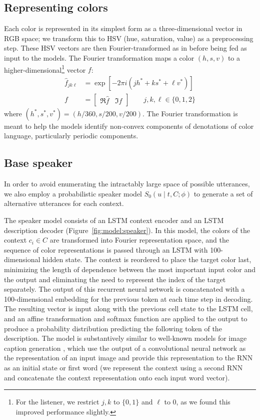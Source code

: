 \documentclass[11pt,letterpaper]{article}
\newcommand{\Speaker}{S}
\newcommand{\utt}{u}
\newcommand{\referent}{c}
\newcommand{\context}{C}
\newcommand{\target}{t}
\newcommand{\feat}{f}
\renewcommand{\|}{\mid}
\newcommand{\figref}[1]{Figure~\ref{#1}}
\begin{document}
\subsection{Representing colors} \label{sec:color_repr}

Each color is represented in its simplest form as a three-dimensional vector in
RGB space; we transform this to HSV (hue, saturation,
value) as a preprocessing step. These HSV vectors are then Fourier-transformed as in  before being fed as input to the models.
The Fourier transformation maps a color
$(h, s, v)$ to a higher-dimensional\footnote{For the listener, we restrict $j,k$ to $\{0, 1\}$ and $\ell$ to 0, as we
found this improved performance slightly.} vector $\feat$:
\begin{align*}
\hat{\feat}_{jk\ell} &= \exp \left[-2\pi i \left(jh^* + ks^* + \ell v^*\right)\right] \\
\feat &= \begin{bmatrix}
  \Re{\hat{\feat}} & \Im{\hat{\feat}}
\end{bmatrix}\qquad j,k,\ell \in \{0,1,2\}
\end{align*}
where $(h^*, s^*, v^*) = (h / 360, s / 200, v/200)$.
The Fourier transformation is meant to help the models identify non-convex components
of denotations of color language, particularly periodic components.

\subsection{Base speaker}\label{sec:s0}

In order to avoid enumerating the intractably large space of possible utterances,
we also employ a probabilistic speaker model
$\Speaker_0(\utt \| \target, \context; \phi)$ to generate a set of alternative
utterances for each context.

The speaker model consists of an LSTM context encoder
and an LSTM description decoder (\figref{fig:model:speaker}). In this model, the colors of the context
$\referent_i \in \context$ are transformed into Fourier representation space,
and the sequence of color representations is passed through an LSTM with
100-dimensional hidden state. The context is reordered to place the target color
last, minimizing the length of dependence between the most important input color
and the output \cite{Sutskever2014} and eliminating the need to represent the
index of the target separately.
The output of this recurrent neural network is concatenated with a
100-dimensional embedding for the previous token at each time step in decoding.
The resulting vector is input along with the previous cell state to the LSTM cell,
and an affine transformation and softmax function are applied to the output to
produce a probability distribution predicting the following token of the description.
The model is substantively similar to well-known models for image caption generation
\cite{Karpathy2015,Vinyals2015}, which use the output of a convolutional neural
network as the representation of an input image and provide this representation
to the RNN as an initial state or first word (we represent the context using
a second RNN and concatenate the context representation onto each input word vector).
\end{document}
